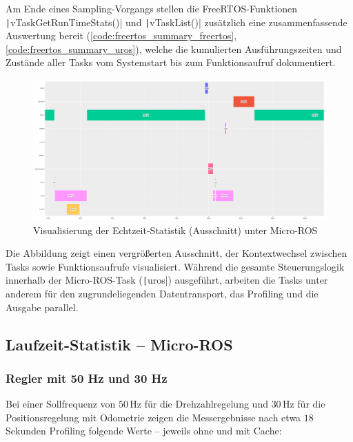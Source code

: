 Am Ende eines Sampling-Vorgangs stellen die FreeRTOS-Funktionen
\texttt|vTaskGetRunTimeStats()| und \texttt|vTaskList()|
zusätzlich eine zusammenfassende Auswertung bereit
(\ref{code:freertos_summary_freertos}, \ref{code:freertos_summary_uros}), welche
die kumulierten Ausführungszeiten und Zustände aller Tasks vom Systemstart bis
zum Funktionsaufruf dokumentiert.

\begin{figure}[h]
    \centering
    \includegraphics[width=1\textwidth]{assets/micro_ros_profiling_ausschnitt_cache_enabled}
    \caption{Visualisierung der Echtzeit-Statistik (Ausschnitt) unter Micro-ROS}
\end{figure}

 Die Abbildung zeigt einen vergrößerten
Ausschnitt, der Kontextwechsel zwischen Tasks sowie Funktionsaufrufe
visualisiert. Während die gesamte Steuerungslogik innerhalb der Micro-ROS-Task
(\texttt|uros|) ausgeführt, arbeiten die Tasks unter anderem für den
zugrundeliegenden Datentransport, das Profiling und die Ausgabe parallel.

\subsection{Laufzeit-Statistik -- Micro-ROS}

\subsubsection{Regler mit 50 Hz und 30 Hz}

Bei einer Sollfrequenz von $50\,\text{Hz}$ für die Drehzahlregelung und
$30\,\text{Hz}$ für die Positionsregelung mit Odometrie zeigen die
Messergebnisse nach etwa $18$ Sekunden Profiling folgende Werte -- jeweils ohne
und mit Cache:

